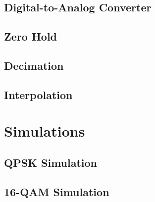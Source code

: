 \documentclass[]{article}
\begin{document}
\subsection{Digital-to-Analog Converter}
\label{app:da}


\subsection{Zero Hold}
\label{app:zero}
\subsection{Decimation}

\subsection{Interpolation}



\section{Simulations}
\subsection{QPSK Simulation}


\subsection{16-QAM Simulation}

\end{document}
